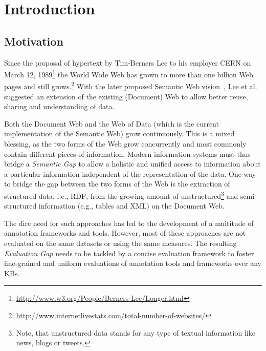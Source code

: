 \chapter{Introduction}

\section*{Motivation}

Since the proposal of hypertext by Tim-Berners Lee to his employer CERN on March 12, 1989\footnote{\url{http://www.w3.org/People/Berners-Lee/Longer.html}} the World Wide Web has grown to more than one billion Web pages and still grows.\footnote{\url{http://www.internetlivestats.com/total-number-of-websites/}}
With the later proposed Semantic Web vision~\cite{bernerslee2001semantic}, Lee et al. suggested an extension of the existing (Document) Web to allow better reuse, sharing and understanding of data.

Both the Document Web and the Web of Data (which is the current implementation of the Semantic Web) grow continuously. 
This is a mixed blessing, as the two forms of the Web grow concurrently and most commonly contain different pieces of information. 
Modern information systems must thus bridge a \emph{Semantic Gap} to allow a holistic and unified access to information about a particular information independent of the representation of the data.
One way to bridge the gap between the two forms of the Web is the extraction of structured data, i.e., RDF, from the growing amount of unstructured\footnote{Note, that unstructured data stands for any type of textual information like news, blogs or tweets.} and semi-structured information (e.g., tables and XML) on the Document Web.

The dire need for such approaches has led to the development of a multitude of annotation frameworks and tools. 
However, most of these approaches are not evaluated on the same datasets or using the same measures.
The resulting \emph{Evaluation Gap} needs to be tackled by a concise evaluation framework to foster fine-grained and uniform evaluations of annotation tools and frameworks over any \ac{KB}s.

